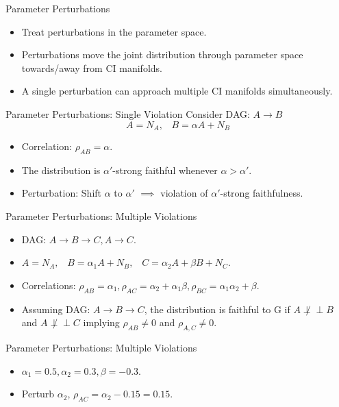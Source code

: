 \documentclass{beamer}
\def\ci{\perp\!\!\!\!\!\perp}
\begin{document}
\begin{frame}{Parameter Perturbations}
	\begin{itemize}
		\item Treat perturbations in the parameter space.
		\item Perturbations move the joint distribution through parameter space towards/away from CI manifolds.
		\item A single perturbation can approach multiple CI manifolds simultaneously.
	\end{itemize}
\end{frame}

\begin{frame}{Parameter Perturbations: Single Violation}
	Consider DAG: $ A \rightarrow B $
	$$ A = N_A, \;\;\; B = \alpha A + N_B $$
	\begin{itemize}
		\item Correlation: $ \rho_{AB} = \alpha $.
		\item The distribution is $ \alpha'$-strong faithful whenever $ \alpha > \alpha' $.
		\item Perturbation: Shift $ \alpha $ to $ \alpha' $ $ \implies $ violation of $ \alpha'$-strong faithfulness.
	\end{itemize}
\end{frame}

\begin{frame}{Parameter Perturbations: Multiple Violations}
	\begin{itemize}
		\item DAG: $ A \rightarrow B \rightarrow C, A \rightarrow C $.
		\item $ A = N_A, \;\;\; B = \alpha_1 A + N_B, \;\;\; C = \alpha_2 A + \beta B + N_C $.
		\item Correlations: $ \rho_{AB} = \alpha_1, \rho_{AC} = \alpha_2 + \alpha_1 \beta , \rho_{BC} = \alpha_1 \alpha_2 + \beta$.
		\item  Assuming DAG: $ A \rightarrow B \rightarrow C $, the distribution is faithful to G if $ A \not \ci B $ and $ A \not \ci C $ implying $ \rho_{AB} \ne 0 $ and $ \rho_{A,C} \ne 0 $.
	\end{itemize}	
\end{frame}

\begin{frame}{Parameter Perturbations: Multiple Violations}
	\begin{itemize}
		\item $ \alpha_1 = 0.5, \alpha_2 = 0.3, \beta = -0.3 $.
		\item Perturb $ \alpha_2 $, $ \rho_{AC} = \alpha_2 - 0.15 = 0.15 $.
	\end{itemize}
\end{frame}
\end{document}
